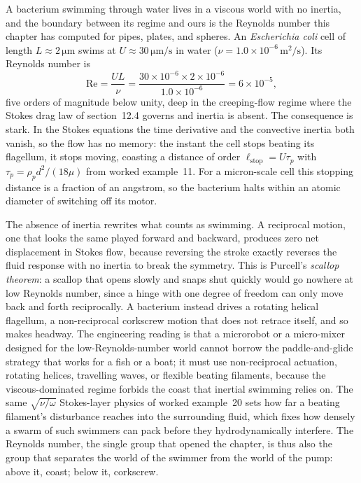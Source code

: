 A bacterium swimming through water lives in a viscous world with no
inertia, and the boundary between its regime and ours is the Reynolds
number this chapter has computed for pipes, plates, and spheres. An
\emph{Escherichia coli} cell of length $L\approx2\,\si{\micro\meter}$
swims at $U\approx30\,\si{\micro\meter\per\second}$ in water ($\nu =
1.0\times10^{-6}\,\si{\meter}^2/\si{\second}$). Its Reynolds number is
\[
\text{Re} = \frac{U L}{\nu} = \frac{30\times10^{-6}\times2\times
10^{-6}}{1.0\times10^{-6}} = 6\times10^{-5},
\]
five orders of magnitude below unity, deep in the creeping-flow regime
where the Stokes drag law of section~12.4 governs and inertia is
absent. The consequence is stark. In the Stokes equations the time
derivative and the convective inertia both vanish, so the flow has no
memory: the instant the cell stops beating its flagellum, it stops
moving, coasting a distance of order $\ell_{\text{stop}} = U\tau_p$
with $\tau_p = \rho_p d^2/(18\mu)$ from worked example~11. For a
micron-scale cell this stopping distance is a fraction of an angstrom,
so the bacterium halts within an atomic diameter of switching off its
motor.

The absence of inertia rewrites what counts as swimming. A reciprocal
motion, one that looks the same played forward and backward, produces
zero net displacement in Stokes flow, because reversing the stroke
exactly reverses the fluid response with no inertia to break the
symmetry. This is Purcell's \emph{scallop theorem}: a scallop that
opens slowly and snaps shut quickly would go nowhere at low Reynolds
number, since a hinge with one degree of freedom can only move
back and forth reciprocally. A bacterium instead drives a rotating
helical flagellum, a non-reciprocal corkscrew motion that does not
retrace itself, and so makes headway. The engineering reading is that
a microrobot or a micro-mixer designed for the low-Reynolds-number
world cannot borrow the paddle-and-glide strategy that works for a
fish or a boat; it must use non-reciprocal actuation, rotating helices,
travelling waves, or flexible beating filaments, because the
viscous-dominated regime forbids the coast that inertial swimming
relies on. The same $\sqrt{\nu/\omega}$ Stokes-layer physics of worked
example~20 sets how far a beating filament's disturbance reaches into
the surrounding fluid, which fixes how densely a swarm of such swimmers
can pack before they hydrodynamically interfere. The Reynolds number,
the single group that opened the chapter, is thus also the group that
separates the world of the swimmer from the world of the pump: above
it, coast; below it, corkscrew.

